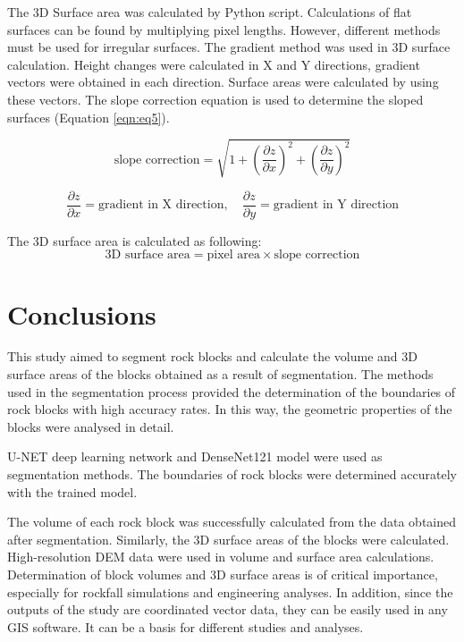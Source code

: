 \documentclass[a4paper,fleqn]{cas-sc}
\begin{document}
The 3D Surface area was calculated by Python script. Calculations of flat surfaces can be found by multiplying pixel lengths. However, different methods must be used for irregular surfaces. The gradient method was used in 3D surface calculation. Height changes were calculated in X and Y directions, gradient vectors were obtained in each direction. Surface areas were calculated by using these vectors. The slope correction equation is used to determine the sloped surfaces (Equation \ref{eqn:eq5}).

\begin{equation}
\label{eqn:eq5}
\text{slope correction} = \sqrt{1 + \left(\frac{\partial z}{\partial x}\right)^2 + \left(\frac{\partial z}{\partial y}\right)^2}
\end{equation}

\[
\frac{\partial z}{\partial x} = \text{gradient in X direction}, \quad \frac{\partial z}{\partial y} = \text{gradient in Y direction}
\]

The 3D surface area is calculated as following:
\[
\text{3D surface area} = \text{pixel area} \times \text{slope correction}
\]


\section{Conclusions}

This study aimed to segment rock blocks and calculate the volume and 3D surface areas of the blocks obtained as a result of segmentation. The methods used in the segmentation process provided the determination of the boundaries of rock blocks with high accuracy rates. In this way, the geometric properties of the blocks were analysed in detail.

U-NET deep learning network and DenseNet121 model were used as segmentation methods. The boundaries of rock blocks were determined accurately with the trained model.

The volume of each rock block was successfully calculated from the data obtained after segmentation. Similarly, the 3D surface areas of the blocks were calculated. High-resolution DEM data were used in volume and surface area calculations. Determination of block volumes and 3D surface areas is of critical importance, especially for rockfall simulations and engineering analyses. In addition, since the outputs of the study are coordinated vector data, they can be easily used in any GIS software. It can be a basis for different studies and analyses.
\end{document}
